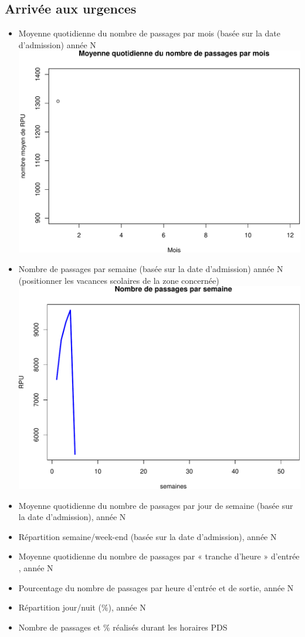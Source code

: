 \documentclass[]{article}
\begin{document}
\subsection{Arrivée aux urgences}\label{arrivee-aux-urgences}

\begin{itemize}
\item
  Moyenne quotidienne du nombre de passages par mois (basée sur la date
  d'admission) année N
  \includegraphics{rapport_2014_files/figure-latex/mean_month-1.pdf}
\item
  Nombre de passages par semaine (basée sur la date d'admission) année N
  (positionner les vacances scolaires de la zone concernée)
  \includegraphics{rapport_2014_files/figure-latex/rpu_semaine-1.pdf}
\item
  Moyenne quotidienne du nombre de passages par jour de semaine (basée
  sur la date d'admission), année N
\item
  Répartition semaine/week-end (basée sur la date d'admission), année N
\item
  Moyenne quotidienne du nombre de passages par « tranche d'heure »
  d'entrée , année N
\item
  Pourcentage du nombre de passages par heure d'entrée et de sortie,
  année N
\item
  Répartition jour/nuit (\%), année N
\item
  Nombre de passages et \% réalisés durant les horaires PDS
\end{itemize}
\end{document}

